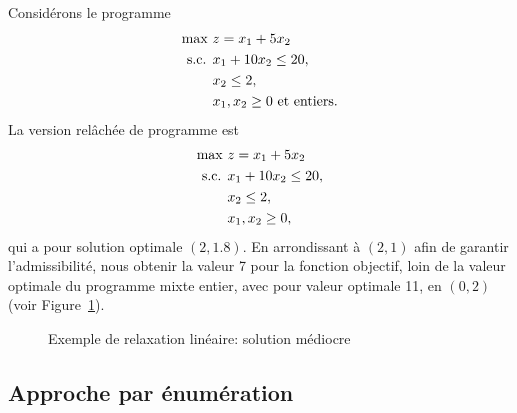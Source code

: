 \begin{example}
Considérons le programme
\begin{align*}
\max\ & z = x_1+5x_2\\
\mbox{s.c. } & x_1+10x_2 \leq 20, \\
& x_2 \leq 2, \\
& x_1, x_2 \geq 0 \mbox{ et entiers}.
\end{align*}
La version relâchée de programme est
\begin{align*}
\max\ & z = x_1+5x_2\\
\mbox{s.c. } & x_1+10x_2 \leq 20, \\
& x_2 \leq 2, \\
& x_1, x_2 \geq 0,
\end{align*}
qui a pour solution optimale $(2,1.8)$. En arrondissant à $(2,1)$ afin de garantir l'admissibilité, nous obtenir la valeur 7 pour la fonction objectif, loin de la valeur optimale du programme mixte entier, avec pour valeur optimale 11, en $(0,2)$ (voir Figure~\ref{fig:relaxation_2}).
\begin{figure}[htb]
\begin{center}
\caption{Exemple de relaxation linéaire: solution médiocre}
\label{fig:relaxation_2}
\end{center}
\end{figure}
\end{example}

\subsection{Approche par énumération}

